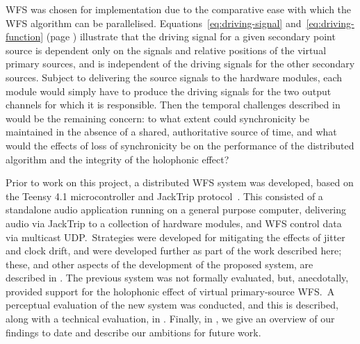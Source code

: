 WFS was chosen for implementation due to the comparative ease with which the WFS
algorithm can be parallelised.
Equations~\eqref{eq:driving-signal} and~\eqref{eq:driving-function} (page
\pageref{eq:driving-signal}) illustrate that the driving signal for a given
secondary point source is dependent only on the signals and relative positions
of the virtual primary sources, and is independent of the driving signals for
the other secondary sources.
Subject to delivering the source signals to the hardware modules, each module
would simply have to produce the driving signals for the two output channels
for which it is responsible.
Then the temporal challenges described in  would
be the remaining concern: to what extent could synchronicity be maintained
in the absence of a shared, authoritative source of time, and what would the
effects of loss of synchronicity be on the performance of the distributed
algorithm and the integrity of the holophonic effect?

Prior to work on this project, a distributed WFS system was developed, based on
the Teensy 4.1 microcontroller and JackTrip
protocol~\citep{rushton_microcontroller-based_2023}.
This consisted of a standalone audio application running on a general purpose
computer, delivering audio via JackTrip to a collection of hardware modules,
and WFS control data via multicast UDP.\
Strategies were developed for mitigating the effects of jitter and clock drift,
and were developed further as part of the work described here;
these, and other aspects of the development of the proposed system, are
described in \secref{sec:method}.
The previous system was not formally evaluated, but, anecdotally, provided
support for the holophonic effect of virtual primary-source WFS.\
A perceptual evaluation of the new system was conducted, and this is described,
along with a technical evaluation, in \secref{sec:results}.
Finally, in \secref{sec:conclusion}, we give an overview of our findings to date
and describe our ambitions for future work.
